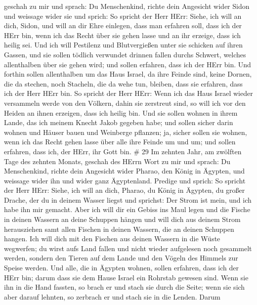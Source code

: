 geschah zu mir und sprach:  Du Menschenkind, richte dein
Angesicht wider Sidon und weissage wider sie  und sprich:
So spricht der Herr HErr: Siehe, ich will an dich, Sidon, und will an
dir Ehre einlegen, dass man erfahren soll, dass ich der HErr bin, wenn
ich das Recht über sie gehen lasse und an ihr erzeige, dass ich heilig
sei.  Und ich will Pestilenz und Blutvergießen unter sie
schicken auf ihren Gassen, und sie sollen tödlich verwundet drinnen
fallen durchs Schwert, welches allenthalben über sie gehen wird; und
sollen erfahren, dass ich der HErr bin.  Und forthin sollen
allenthalben um das Haus Israel, da ihre Feinde sind, keine Dornen, die
da stechen, noch Stacheln, die da wehe tun, bleiben, dass sie erfahren,
dass ich der Herr HErr bin.  So spricht der Herr HErr: Wenn
ich das Haus Israel wieder versammeln werde von den Völkern, dahin sie
zerstreut sind, so will ich vor den Heiden an ihnen erzeigen, dass ich
heilig bin. Und sie sollen wohnen in ihrem Lande, das ich meinem Knecht
Jakob gegeben habe;  und sollen sicher darin wohnen und
Häuser bauen und Weinberge pflanzen; ja, sicher sollen sie wohnen, wenn
ich das Recht gehen lasse über alle ihre Feinde um und um; und sollen
erfahren, dass ich, der HErr, ihr Gott bin. \# 29  Im
zehnten Jahr, am zwölften Tage des zehnten Monats, geschah des HErrn
Wort zu mir und sprach:  Du Menschenkind, richte dein
Angesicht wider Pharao, den König in Ägypten, und weissage wider ihn und
wider ganz Ägyptenland.  Predige und sprich: So spricht der
Herr HErr: Siehe, ich will an dich, Pharao, du König in Ägypten, du
großer Drache, der du in deinem Wasser liegst und sprichst: Der Strom
ist mein, und ich habe ihn mir gemacht.  Aber ich will dir
ein Gebiss ins Maul legen und die Fische in deinen Wassern an deine
Schuppen hängen und will dich aus deinem Strom herausziehen samt allen
Fischen in deinen Wassern, die an deinen Schuppen hangen. 
Ich will dich mit den Fischen aus deinen Wassern in die Wüste wegwerfen;
du wirst aufs Land fallen und nicht wieder aufgelesen noch gesammelt
werden, sondern den Tieren auf dem Lande und den Vögeln des Himmels zur
Speise werden.  Und alle, die in Ägypten wohnen, sollen
erfahren, dass ich der HErr bin; darum dass sie dem Hause Israel ein
Rohrstab gewesen sind.  Wenn sie ihn in die Hand fassten, so
brach er und stach sie durch die Seite; wenn sie sich aber darauf
lehnten, so zerbrach er und stach sie in die Lenden.  Darum
